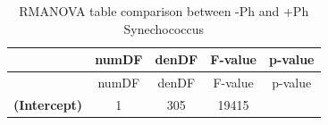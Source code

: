 \documentclass[]{article}
\begin{document}
\begin{longtable}[]{@{}ccccc@{}}
\caption{RMANOVA table comparison between -Ph and +Ph
Synechococcus}\tabularnewline
\toprule
\begin{minipage}[b]{0.27\columnwidth}\centering\strut
~
\strut\end{minipage} &
\begin{minipage}[b]{0.10\columnwidth}\centering\strut
numDF
\strut\end{minipage} &
\begin{minipage}[b]{0.10\columnwidth}\centering\strut
denDF
\strut\end{minipage} &
\begin{minipage}[b]{0.12\columnwidth}\centering\strut
F-value
\strut\end{minipage} &
\begin{minipage}[b]{0.12\columnwidth}\centering\strut
p-value
\strut\end{minipage}\tabularnewline
\midrule
\endfirsthead
\toprule
\begin{minipage}[b]{0.27\columnwidth}\centering\strut
~
\strut\end{minipage} &
\begin{minipage}[b]{0.10\columnwidth}\centering\strut
numDF
\strut\end{minipage} &
\begin{minipage}[b]{0.10\columnwidth}\centering\strut
denDF
\strut\end{minipage} &
\begin{minipage}[b]{0.12\columnwidth}\centering\strut
F-value
\strut\end{minipage} &
\begin{minipage}[b]{0.12\columnwidth}\centering\strut
p-value
\strut\end{minipage}\tabularnewline
\midrule
\endhead
\begin{minipage}[t]{0.27\columnwidth}\centering\strut
\textbf{(Intercept)}
\strut\end{minipage} &
\begin{minipage}[t]{0.10\columnwidth}\centering\strut
1
\strut\end{minipage} &
\begin{minipage}[t]{0.10\columnwidth}\centering\strut
305
\strut\end{minipage} &
\begin{minipage}[t]{0.12\columnwidth}\centering\strut
19415
\strut\end{minipage} &
\begin{minipage}[t]{0.12\columnwidth}\centering\strut

\end{minipage}
\end{longtable}
\end{document}
